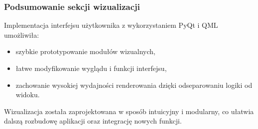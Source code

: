 \subsubsection{Podsumowanie sekcji wizualizacji}

Implementacja interfejsu użytkownika z wykorzystaniem PyQt i QML umożliwiła:
\begin{itemize}
    \item szybkie prototypowanie modułów wizualnych,
    \item łatwe modyfikowanie wyglądu i funkcji interfejsu,
    \item zachowanie wysokiej wydajności renderowania dzięki odseparowaniu logiki od widoku.
\end{itemize}

Wizualizacja została zaprojektowana w sposób intuicyjny i modularny, co ułatwia dalszą rozbudowę aplikacji oraz integrację nowych funkcji.
